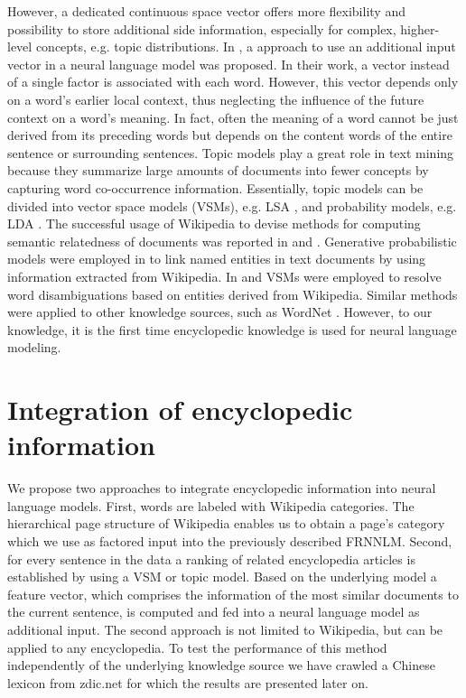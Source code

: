 \documentclass[a4paper]{article}
\begin{document}
However, a dedicated continuous space vector offers more flexibility and possibility to store additional side information, especially for complex, higher-level concepts, e.g. topic distributions. In \cite{mikolov2012context}, a approach to use an additional input vector in a neural language model was proposed. In their work, a vector instead of a single factor is associated with each word. However, this vector depends only on a word's earlier local context, thus neglecting the influence of the future context on a word's meaning. 
In fact, often the meaning of a word cannot be just derived from its preceding words but depends on the content words of the entire sentence or surrounding sentences. 
Topic models play a great role in text mining because they summarize large amounts of documents into fewer concepts by capturing word co-occurrence information. Essentially, topic models can be divided into vector space models (VSMs), e.g. LSA \cite{deerwester1990indexing}, and probability models, e.g. LDA \cite{blei2003latent}. 
The successful usage of Wikipedia to devise methods for computing semantic relatedness of documents was reported in \cite{gabrilovich2007computing} and \cite{strube2006wikirelate}.
Generative probabilistic models were employed in \cite{han2012entity} to link named entities in text documents by using information extracted from Wikipedia. 
In \cite{cucerzan2007large} and \cite{bunescu2006using} VSMs were employed to resolve word disambiguations based on entities derived from Wikipedia.
Similar methods were applied to other knowledge sources, such as WordNet \cite{hearst1992automatic}.
However, to our knowledge, it is the first time encyclopedic knowledge is used for neural language modeling.

\section{Integration of encyclopedic information}
We propose two approaches to integrate encyclopedic information into neural language models.
First, words are labeled with Wikipedia categories. The hierarchical page structure of Wikipedia enables us to obtain a page's category which we use as factored input into the previously described FRNNLM.
Second, for every sentence in the data a ranking of related encyclopedia articles is established by using a VSM or topic model. Based on the underlying model a feature vector, which comprises the information of the most similar documents to the current sentence, is computed  and fed into a neural language model as additional input. The second approach is not limited to Wikipedia, but can be applied to any encyclopedia. To test the performance of this method independently of the underlying knowledge source we have crawled a Chinese lexicon from zdic.net \cite{zdic} for which the results are presented later on. 
\end{document}
